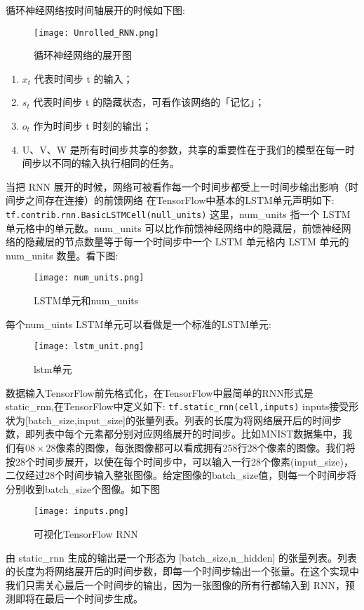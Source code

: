循环神经网络按时间轴展开的时候如下图:
\begin{figure}[H]
	\texttt{[image: Unrolled\_RNN.png]}
	\caption{循环神经网络的展开图}
\end{figure}
\begin{enumerate}
\item $x_t$ 代表时间步 t 的输入；
\item $s_t$ 代表时间步 t 的隐藏状态，可看作该网络的「记忆」；
\item $o_t$ 作为时间步 t 时刻的输出；
\item U、V、W 是所有时间步共享的参数，共享的重要性在于我们的模型在每一时间步以不同的输入执行相同的任务。
\end{enumerate}
当把 RNN 展开的时候，网络可被看作每一个时间步都受上一时间步输出影响（时间步之间存在连接）的前馈网络
在TensorFlow中基本的LSTM单元声明如下:
\lstinline[language=Python]{tf.contrib.rnn.BasicLSTMCell(null_units)}
这里，num\_units 指一个 LSTM 单元格中的单元数。num\_units 可以比作前馈神经网络中的隐藏层，前馈神经网络的隐藏层的节点数量等于每一个时间步中一个 LSTM 单元格内 LSTM 单元的 num\_units 数量。看下图:
\begin{figure}[H]
	\texttt{[image: num\_units.png]}
	\caption{LSTM单元和num\_units}
\end{figure}
每个num\_uints LSTM单元可以看做是一个标准的LSTM单元:
\begin{figure}[H]
	\texttt{[image: lstm\_unit.png]}
	\caption{lstm单元}
\end{figure}
数据输入TensorFlow前先格式化，在TensorFlow中最简单的RNN形式是static\_rnn,在TensorFlow中定义如下:
\lstinline[language=Python]{tf.static_rnn(cell,inputs)}
inputs接受形状为[batch\_size,input\_size]的张量列表。列表的长度为将网络展开后的时间步数，即列表中每个元素都分别对应网络展开的时间步。比如MNIST数据集中，我们有$08\times28$像素的图像，每张图像都可以看成拥有258行28个像素的图像。我们将按28个时间步展开，以使在每个时间步中，可以输入一行28个像素(input\_size)，二仅经过28个时间步输入整张图像。给定图像的batch\_size值，则每一个时间步将分别收到batch\_size个图像。如下图
\begin{figure}[H]
	\texttt{[image: inputs.png]}
	\caption{可视化TensorFlow RNN}
\end{figure}
由 static\_rnn 生成的输出是一个形态为 [batch\_size,n\_hidden] 的张量列表。列表的长度为将网络展开后的时间步数，即每一个时间步输出一个张量。在这个实现中我们只需关心最后一个时间步的输出，因为一张图像的所有行都输入到 RNN，预测即将在最后一个时间步生成。
